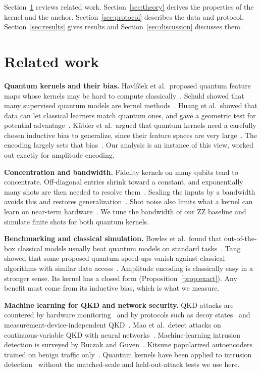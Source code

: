 \documentclass[pdflatex,sn-mathphys-num,lineno]{sn-jnl}
\theoremstyle{thmstyleone}
\begin{document}
Section~\ref{sec:related} reviews related work. Section~\ref{sec:theory} derives
the properties of the kernel and the anchor. Section~\ref{sec:protocol} describes
the data and protocol. Section~\ref{sec:results} gives results and
Section~\ref{sec:discussion} discusses them.

\section{Related work}
\label{sec:related}

\textbf{Quantum kernels and their bias.} Havl\'i\v{c}ek et al.\ proposed quantum
feature maps whose kernels may be hard to compute
classically~\cite{havlicek2019supervised}. Schuld showed that many supervised
quantum models are kernel methods~\cite{schuld2021supervised}. Huang et al.\
showed that data can let classical learners match quantum ones, and gave a
geometric test for potential advantage~\cite{huang2021power}. K\"ubler et al.\
argued that quantum kernels need a carefully chosen inductive bias to generalize,
since their feature spaces are very large~\cite{kubler2021inductive}. The encoding
largely sets that bias~\cite{schuld2021effect,larose2020robust}. Our analysis is
an instance of this view, worked out exactly for amplitude encoding.

\textbf{Concentration and bandwidth.} Fidelity kernels on many qubits tend to
concentrate. Off-diagonal entries shrink toward a constant, and exponentially many
shots are then needed to resolve them~\cite{thanasilp2024exponential}. Scaling the
inputs by a bandwidth avoids this and restores
generalization~\cite{shaydulin2022importance,canatar2022bandwidth}. Shot noise
also limits what a kernel can learn on near-term
hardware~\cite{wang2021towards,hubregtsen2022training}. We tune the bandwidth of
our ZZ baseline and simulate finite shots for both quantum kernels.

\textbf{Benchmarking and classical simulation.} Bowles et al.\ found that
out-of-the-box classical models usually beat quantum models on standard
tasks~\cite{bowles2024better}. Tang showed that some proposed quantum speed-ups
vanish against classical algorithms with similar data
access~\cite{tang2019quantum}. Amplitude encoding is classically easy in a
stronger sense. Its kernel has a closed form (Proposition~\ref{prop:exact}). Any
benefit must come from its inductive bias, which is what we measure.

\textbf{Machine learning for QKD and network security.} QKD attacks are countered
by hardware monitoring~\cite{dasilva2012monitoring} and by protocols such as decoy
states~\cite{lo2005decoy} and measurement-device-independent
QKD~\cite{lo2012measurement}. Mao et al.\ detect attacks on continuous-variable QKD
with neural networks~\cite{mao2020detecting}. Machine-learning intrusion detection
is surveyed by Buczak and Guven~\cite{buczak2016survey}. Kitsune popularized
autoencoders trained on benign traffic only~\cite{mirsky2018kitsune}. Quantum
kernels have been applied to intrusion
detection~\cite{kalinin2023security,suryotrisongko2022evaluating} without the
matched-scale and held-out-attack tests we use here.
\end{document}
